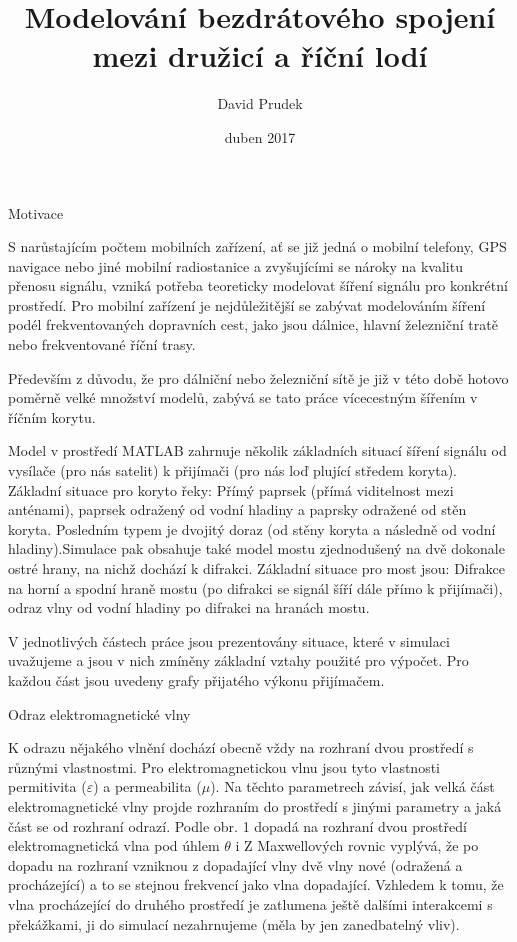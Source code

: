  
 
 
 \worktype [B/CZ]
 \title {Modelování bezdrátového spojení mezi družicí a říční lodí}
 \author {David Prudek}
 \date {duben 2017}
 \makefront
 
 \def\frac#1#2{{\begingroup#1\endgroup\over#2}} %

 \chap Motivace
 
 S narůstajícím počtem mobilních zařízení, ať se již jedná o mobilní
telefony, GPS navigace nebo jiné mobilní radiostanice a zvyšujícími se nároky
na kvalitu přenosu signálu, vzniká potřeba teoreticky modelovat šíření signálu
pro konkrétní prostředí. Pro mobilní zařízení je nejdůležitější se zabývat
modelováním šíření podél frekventovaných dopravních cest, jako jsou dálnice,
hlavní železniční tratě nebo frekventované říční trasy.
	
	Především z důvodu, že pro dálniční nebo železniční sítě je již v této době
hotovo poměrně velké množství modelů, zabývá se tato práce vícecestným
šířením v říčním korytu.

	Model v prostředí MATLAB zahrnuje několik základních situací šíření
signálu od vysílače (pro nás satelit) k přijímači (pro nás loď plující středem
koryta). Základní situace pro koryto řeky: Přímý paprsek (přímá viditelnost mezi
anténami), paprsek odražený od vodní hladiny a paprsky odražené od stěn
koryta. Posledním typem je dvojitý doraz (od stěny koryta a následně od vodní
hladiny).Simulace pak obsahuje také model mostu zjednodušený na dvě
dokonale ostré hrany, na nichž dochází k difrakci. Základní situace pro most
jsou: Difrakce na horní a spodní hraně mostu (po difrakci se signál šíří dále
přímo k přijímači), odraz vlny od vodní hladiny po difrakci na hranách mostu.

	V jednotlivých částech práce jsou prezentovány situace, které v simulaci
uvažujeme a jsou v nich zmíněny základní vztahy použité pro výpočet.
Pro každou část jsou uvedeny grafy přijatého výkonu přijímačem.
 
 
 \chap Odraz elektromagnetické vlny

K odrazu nějakého vlnění dochází obecně vždy na rozhraní dvou
prostředí s různými vlastnostmi. Pro elektromagnetickou vlnu jsou tyto
vlastnosti permitivita ($\varepsilon$) a permeabilita ($\mu$). Na těchto parametrech závisí, jak
velká část elektromagnetické vlny projde rozhraním do prostředí s jinými
parametry a jaká část se od rozhraní odrazí. Podle obr. 1 dopadá na rozhraní
dvou prostředí elektromagnetická vlna pod úhlem $\theta$ i Z Maxwellových rovnic
vyplývá, že po dopadu na rozhraní vzniknou z dopadající vlny dvě vlny nové
(odražená a procházející) a to se stejnou frekvencí jako vlna dopadající.
Vzhledem k tomu, že vlna procházející do druhého prostředí je zatlumena
ještě dalšími interakcemi s překážkami, ji do simulací nezahrnujeme (měla by
jen zanedbatelný vliv).
 
